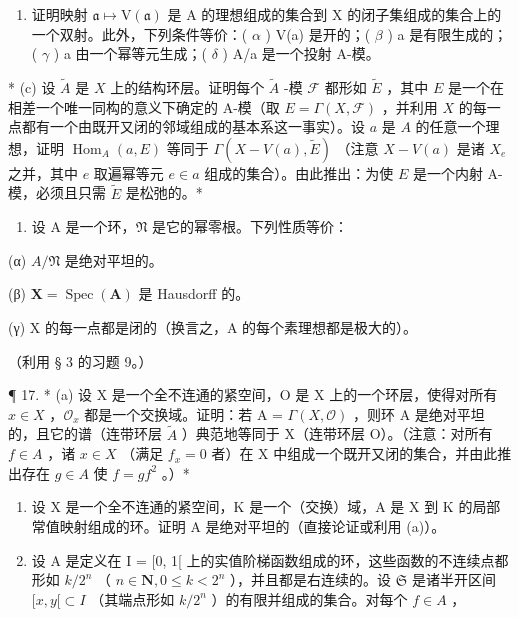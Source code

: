 \begin{enumerate}
\def\labelenumi{(\alph{enumi})}
\setcounter{enumi}{1}
\tightlist
\item
  证明映射 \(\mathfrak{a}\mapsto\mathrm{V}(\mathfrak{a})\) 是 A 的理想组成的集合到 X 的闭子集组成的集合上的一个双射。此外，下列条件等价：( \(\alpha\) ) V(a) 是开的；( \(\beta\) ) a 是有限生成的；( \(\gamma\) ) a 由一个幂等元生成；( \(\delta\) ) A/a 是一个投射 A-模。
\end{enumerate}

* (c) 设 \(\tilde{A}\) 是 \(X\) 上的结构环层。证明每个 \(\tilde{A}\) -模 \(\mathcal{F}\) 都形如 \(\tilde{E}\) ，其中 \(E\) 是一个在相差一个唯一同构的意义下确定的 A-模（取 \(E = \Gamma(X, \mathcal{F})\) ，并利用 \(X\) 的每一点都有一个由既开又闭的邻域组成的基本系这一事实）。设 \(a\) 是 \(A\) 的任意一个理想，证明 \(\operatorname{Hom}_A(a, E)\) 等同于 \(\Gamma(X - V(a), \tilde{E})\) （注意 \(X - V(a)\) 是诸 \(X_e\) 之并，其中 \(e\) 取遍幂等元 \(e \in a\) 组成的集合）。由此推出：为使 \(E\) 是一个内射 A-模，必须且只需 \(\tilde{E}\) 是松弛的。*

\begin{enumerate}
\def\labelenumi{(\alph{enumi})}
\setcounter{enumi}{3}
\tightlist
\item
  设 A 是一个环，\(\mathfrak{N}\) 是它的幂零根。下列性质等价：
\end{enumerate}

(α) \(A/\mathfrak{N}\) 是绝对平坦的。

(β) \(\mathbf{X} = \operatorname{Spec}(\mathbf{A})\) 是 Hausdorff 的。

(γ) X 的每一点都是闭的（换言之，A 的每个素理想都是极大的）。

（利用 § 3 的习题 9。）

¶ 17. * (a) 设 X 是一个全不连通的紧空间，O 是 X 上的一个环层，使得对所有 \(x \in X\) ，\(\mathcal{O}_x\) 都是一个交换域。证明：若 A = \(\Gamma(X, \mathcal{O})\) ，则环 A 是绝对平坦的，且它的谱（连带环层 \(\tilde{A}\) ）典范地等同于 X（连带环层 O）。（注意：对所有 \(f \in A\) ，诸 \(x \in X\) （满足 \(f_x = 0\) 者）在 X 中组成一个既开又闭的集合，并由此推出存在 \(g \in A\) 使 \(f = gf^2\) 。）*

\begin{enumerate}
\def\labelenumi{(\alph{enumi})}
\setcounter{enumi}{1}
\item
  设 X 是一个全不连通的紧空间，K 是一个（交换）域，A 是 X 到 K 的局部常值映射组成的环。证明 A 是绝对平坦的（直接论证或利用 (a)）。
\item
  设 A 是定义在 I = {[}0, 1{[} 上的实值阶梯函数组成的环，这些函数的不连续点都形如 \(k/2^n\) （ \(n \in \mathbf{N}, 0 \leqslant k < 2^n\) ），并且都是右连续的。设 \(\mathfrak{S}\) 是诸半开区间 \([x, y[ \subset I\) （其端点形如 \(k/2^n\) ）的有限并组成的集合。对每个 \(f \in A\) ，
\end{enumerate}

